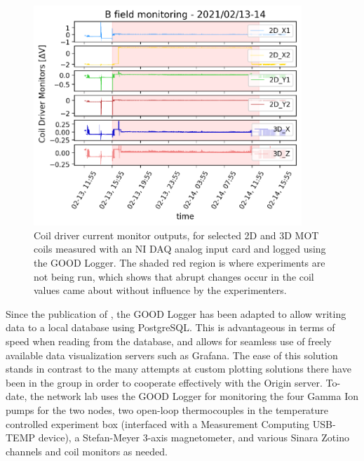 \begin{figure}[!ht]
    \centering
    \includegraphics[width=0.9\textwidth]{Images/goodlogger_coil_jumps_20210213_14.pdf}
    \caption{Coil driver current monitor outputs, for selected 2D and 3D MOT coils measured with an NI DAQ analog input card and logged using the GOOD Logger. The shaded red region is where experiments are not being run, which shows that abrupt changes occur in the coil values came about without influence by the experimenters.}
    \label{fig:coiljumps}
\end{figure}

Since the publication of \cite{Bohorquez2023}, the GOOD Logger has been adapted to allow writing data to a local database using PostgreSQL. This is advantageous in terms of speed when reading from the database, and allows for seamless use of freely available data visualization servers such as Grafana. The ease of this solution stands in contrast to the many attempts at custom plotting solutions there have been in the group in order to cooperate effectively with the Origin server. To-date, the network lab uses the GOOD Logger for monitoring the four Gamma Ion pumps for the two nodes, two open-loop thermocouples in the temperature controlled experiment box (interfaced with a Measurement Computing USB-TEMP device), a Stefan-Meyer 3-axis magnetometer, and various Sinara Zotino channels and coil monitors as needed.



